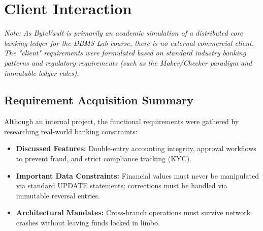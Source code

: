 \chapter{Client Interaction}

\textit{Note: As ByteVault is primarily an academic simulation of a distributed core banking ledger for the DBMS Lab course, there is no external commercial client. The "client" requirements were formulated based on standard industry banking patterns and regulatory requirements (such as the Maker/Checker paradigm and immutable ledger rules).}

\section{Requirement Acquisition Summary}
Although an internal project, the functional requirements were gathered by researching real-world banking constraints:
\begin{itemize}
    \item \textbf{Discussed Features:} Double-entry accounting integrity, approval workflows to prevent fraud, and strict compliance tracking (KYC).
    \item \textbf{Important Data Constraints:} Financial values must never be manipulated via standard UPDATE statements; corrections must be handled via immutable reversal entries.
    \item \textbf{Architectural Mandates:} Cross-branch operations must survive network crashes without leaving funds locked in limbo.
\end{itemize}
